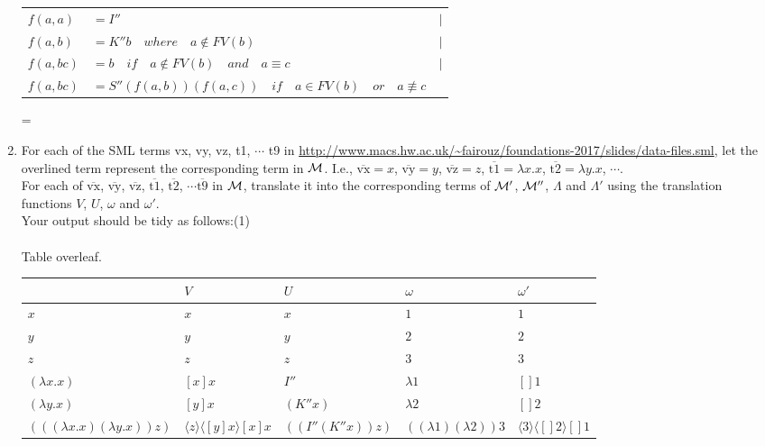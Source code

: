 \documentclass[11pt]{article}
\newenvironment{neverbreak} %
{\par\nobreak\vfil\penalty0\vfilneg
	\vtop\bgroup}
{\par\xdef\tpd{\the\prevdepth}\egroup
	\prevdepth=\tpd}
\begin{document}
\begin{enumerate}
\begin{neverbreak}
\begin{tabular}{lll}
		$f(a, a)$ & $= I''$ & $|$\\
		$f(a, b)$ & $= K''b \quad where\quad a \notin FV(b)$ & $|$\\
		$f(a, bc)$ & $= b \quad if \quad a \notin FV(b) \quad and \quad a\equiv c$&$|$\\
		$f(a, bc)$ & $= S''(f(a, b))(f(a, c))\quad if \quad a \in FV(b) \quad or \quad a\not \equiv c$\\
		\end{tabular}
		\end{neverbreak}
		\vspace{1cm}
    \item
      For each of the SML terms vx, vy, vz, t1, $\cdots$ t9 in \url{http://www.macs.hw.ac.uk/~fairouz/foundations-2017/slides/data-files.sml}, let the overlined term represent the corresponding term in ${\cal M}$.  I.e., $\overline{\mbox{vx}} = x$, $\overline{\mbox{vy}} = y$, $\overline{\mbox{vz}} = z$, $\overline{\mbox{t1}} = \lambda x.x$, $\overline{\mbox{t2}}
      = \lambda y.x$, $\cdots$.\\
      For each of $\overline{\mbox{vx}}$, $\overline{\mbox{vy}}$, $\overline{\mbox{vz}}$, $\overline{\mbox{t1}}$,
      $\overline{\mbox{t2}}$, $\cdots \overline{\mbox{t9}}$ in ${\cal M}$, translate it into the corresponding terms of ${\cal M}'$, ${\cal M}''$, $\Lambda$ and  $\Lambda'$ using the translation functions $V$, $U$, $\omega$ and $\omega'$.  \\
      Your output should be tidy as follows:\hfill{(1)} %
      \\ \\
      Table overleaf. \\
\begin{sideways}
\small
\centering
      \begin{tabular}{|l|l|l|l|l|}
        \hline
        & $V$&$U$&$\omega$&$\omega'$\\
        \hline
	$x$ & $x$ & $x$ & $1$ & $1$	\\
	$y$ & $y$ & $y$ & $2$ & $2$	\\
	$z$ & $z$ & $z$ & $3$ & $3$	\\
	$(\lambda x.x)$ & $[x]x$ & $I''$ & $\lambda 1$ & $[]1$	\\
	$(\lambda y.x)$ & $[y]x$ & $(K'' x)$ & $\lambda 2$ & $[]2$	\\
	$(((\lambda x.x) (\lambda y.x)) z)$ & $\langle z\rangle \langle [y]x\rangle [x]x$ & $((I'' (K'' x)) z)$ & $((\lambda 1)(\lambda 2))3$ & $ \langle3\rangle\langle[]2\rangle[]1$	\\

\end{tabular}
\end{sideways}
\end{enumerate}
\end{document}
